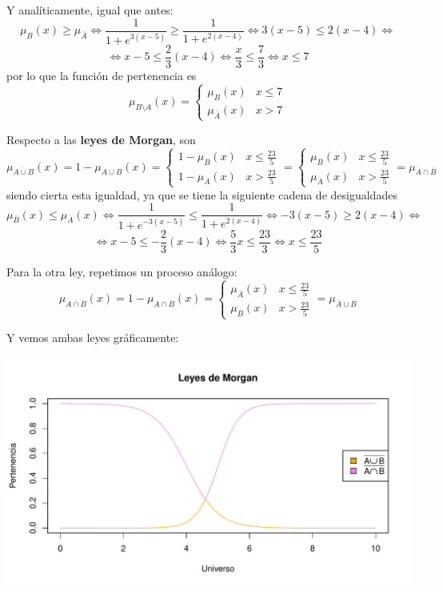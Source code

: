 \documentclass[
]{article}
\begin{document}
Y analíticamente, igual que antes:
\[\mu_{B}\left(x\right)\geq\mu_{\overline{A}}\iff\frac{1}{1+e^{3\left(x-5\right)}}\geq\frac{1}{1+e^{2\left(x-4\right)}}\iff3\left(x-5\right)\leq2\left(x-4\right)\iff\]
\[\iff x-5\leq\frac{2}{3}\left(x-4\right)\iff\frac{x}{3}\leq\frac{7}{3}\iff x\leq7\]
por lo que la función de pertenencia es
\[\mu_{B\setminus A}\left(x\right)=\begin{cases}
\mu_{B}\left(x\right) & x\leq7\\
\mu_{\overline{A}}\left(x\right) & x>7
\end{cases}\]

Respecto a las \textbf{leyes de Morgan}, son
\[\mu_{\overline{A\cup B}}\left(x\right)=1-\mu_{A\cup B}\left(x\right)=\begin{cases}
1-\mu_{B}\left(x\right) & x\leq\frac{23}{5}\\
1-\mu_{A}\left(x\right) & x>\frac{23}{5}
\end{cases}=\begin{cases}
\mu_{\overline{B}}\left(x\right) & x\leq\frac{23}{5}\\
\mu_{\overline{A}}\left(x\right) & x>\frac{23}{5}
\end{cases}=\mu_{\overline{A}\cap\overline{B}}\] siendo cierta esta
igualdad, ya que se tiene la siguiente cadena de desigualdades
\[\mu_{\overline{B}}\left(x\right)\leq\mu_{\overline{A}}\left(x\right)\iff\frac{1}{1+e^{-3\left(x-5\right)}}\leq\frac{1}{1+e^{2\left(x-4\right)}}\iff-3\left(x-5\right)\geq2\left(x-4\right)\iff\]
\[\iff x-5\leq-\frac{2}{3}\left(x-4\right)\iff\frac{5}{3}x\leq\frac{23}{3}\iff x\leq\frac{23}{5}\]

Para la otra ley, repetimos un proceso análogo:
\[\mu_{\overline{A\cap B}}\left(x\right)=1-\mu_{A\cap B}\left(x\right)=\begin{cases}
\mu_{\overline{A}}\left(x\right) & x\leq\frac{23}{5}\\
\mu_{\overline{B}}\left(x\right) & x>\frac{23}{5}
\end{cases}=\mu_{\overline{A}\cup\overline{B}}\]

Y vemos ambas leyes gráficamente:

\includegraphics{tareaBloque3_files/figure-latex/unnamed-chunk-7-1.pdf}
\end{document}
